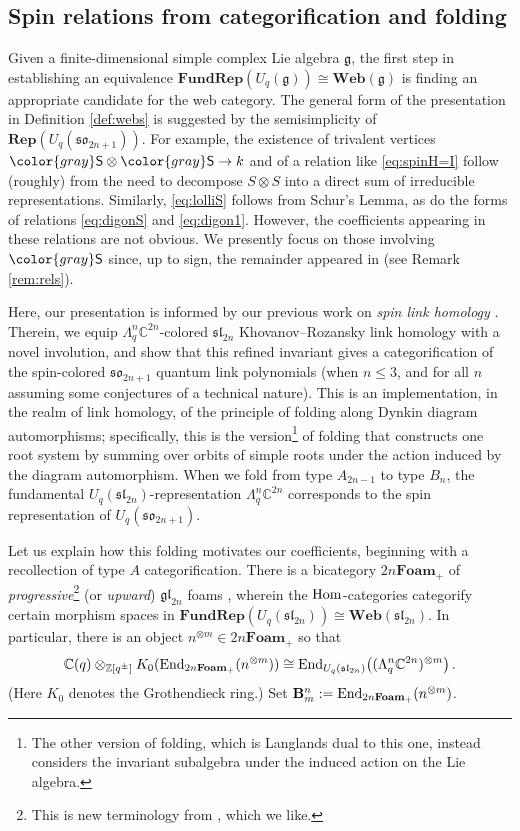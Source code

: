 \documentclass[10pt]{amsart}
\newcommand{\gray}[1]{{\color{gray}#1}}
\numberwithin{equation}{section}
\theoremstyle{definition}
\newcommand{\Hom}{{\rm Hom}}
\newcommand{\End}{{\rm End}}
\renewcommand{\to}{\rightarrow}
\def\C{{\mathbb C}}
\def\Z{{\mathbb Z}}
\newcommand{\sln}[1][n]{\mathfrak{sl}_{#1}}
\newcommand{\gln}[1][n]{\mathfrak{gl}_{#1}}
\newcommand{\son}[1][2n+1]{\mathfrak{so}_{#1}}
\newcommand{\Rep}{\mathbf{Rep}}
\newcommand{\FRep}{\mathbf{FundRep}}
\newcommand{\Web}{\mathbf{Web}}
\newcommand{\gS}{\gray{\mathsf{S}}}
\begin{document}
\subsection{Spin relations from categorification and folding}
	\label{ss:categorification}
Given a finite-dimensional simple complex Lie algebra $\mathfrak{g}$, 
the first step in establishing an equivalence $\FRep(U_q(\mathfrak{g})) \cong \Web(\mathfrak{g})$
is finding an appropriate candidate for the web category.
The general form of the presentation in Definition \ref{def:webs} is suggested by 
the semisimplicity of $\Rep(U_q(\son))$.
For example, the existence of trivalent vertices $\gS \otimes \gS \to k$ 
and of a relation like \eqref{eq:spinH=I} follow (roughly) 
from the need to decompose $S \otimes S$ into a direct sum of irreducible representations.
Similarly, \eqref{eq:lolliS} follows from Schur's Lemma, 
as do the forms of relations \eqref{eq:digonS} and \eqref{eq:digon1}.
However, the coefficients appearing in these relations are not obvious.
We presently focus on those involving $\gS$ since, up to sign,
the remainder appeared in \cite{BodWu} (see Remark \ref{rem:rels}).

Here, our presentation is informed by our previous work on 
\emph{spin link homology} \cite{BER}.
Therein, we equip $\Lambda_q^n \C^{2n}$-colored $\sln[2n]$ Khovanov--Rozansky link homology 
with a novel involution, and show that this refined invariant gives a 
categorification of the spin-colored $\son$ quantum link polynomials 
(when $n \leq 3$, and for all $n$ assuming some conjectures of a technical nature).
This is an implementation, in the realm of link homology, 
of the principle of folding along Dynkin diagram automorphisms;
specifically, this is the version\footnote{The other version of folding, 
which is Langlands dual to this one, instead considers the invariant 
subalgebra under the induced action on the Lie algebra.} 
of folding that constructs one root system by summing over orbits of simple roots 
under the action induced by the diagram automorphism.
When we fold from type $A_{2n-1}$ to type $B_n$, 
the fundamental $U_q(\sln[2n])$-representation $\Lambda_q^n\C^{2n}$ 
corresponds to the spin representation of $U_q(\son)$.

Let us explain how this folding motivates our coefficients, 
beginning with a recollection of type $A$ categorification. 
There is a bicategory $2n\mathbf{Foam_+}$ of 
\emph{progressive}\footnote{This is new terminology from \cite{Recio}, which we like.} 
(or \emph{upward}) $\gln[2n]$ foams \cite{QR1}, 
wherein the $\Hom$-categories categorify certain morphism spaces 
in $\FRep(U_q(\sln[2n])) \cong \Web(\sln[2n])$.
In particular, there is an object $n^{\otimes m} \in 2n\mathbf{Foam_+}$ 
so that
\begin{equation} \label{grothofbnm}
\C(q) \otimes_{\Z[q^{\pm}]} K_0(\End_{2n\mathbf{Foam_+}}(n^{\otimes m})) 
	\cong \End_{U_q(\sln[2n])}\big((\Lambda_q^n\C^{2n})^{\otimes m} \big) \, .
	\end{equation}
(Here $K_0$ denotes the Grothendieck ring.)
Set $\mathbf{B}^n_m := \End_{2n\mathbf{Foam_+}}(n^{\otimes m})$. 
\end{document}
